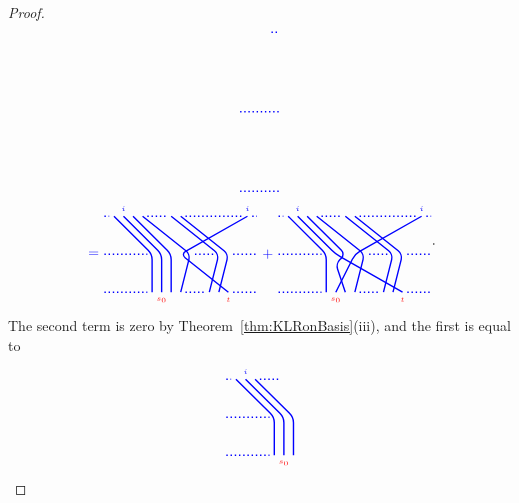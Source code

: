 \documentclass[twoside,11pt,reqno,letter]{amsart}
\numberwithin{equation}{section}
\theoremstyle{definition}  %
\newcommand{\0}{{\bar 0}}
\newcommand{\1}{{\bar 1}}
\newenvironment{braid}{%
  \begin{tikzpicture}[baseline=6mm,blue,line width=1pt, scale=0.4,
                      draw/.append style={rounded corners},
                      every node/.append style={font=\tiny}]%
  }{\end{tikzpicture}
}
\begin{document}
{\begin{proof}
\begin{equation}
\begin{braid}
    \draw[dotted](15.5,10)--(16,10);
    \draw[dotted](13.5,5)--(16,5);
    \draw[dotted](13.5,0)--(16,0);
  \end{braid}
\end{equation}
\[
  \begin{braid}\tikzset{scale=0.6,baseline=12mm}
    \draw(0,4)node[font=\normalsize]{$=$};
  \end{braid}
  \begin{braid}\tikzset{scale=0.6,baseline=12mm}
    \draw(1,8)--(5,4)--(5,0);
    \draw(2,8)node[above]{$i$}--(6,4)--(6,0)node[below,color=red]{$s_0$};
    \draw(3,8)--(7,4)--(7,0);
    \draw(15,8)node[above]{$i$}--(8,4)--(13,0)node[below,color=red]{$t$};
    \draw(4,8)--(9,4)--(8,0);
    \draw(7,8)--(12,4)--(11,0);
    \draw(8,8)--(13,4)--(12,0);
    \draw[dotted](0,8)--(0.5,8);
    \draw[dotted](0,4)--(4.5,4);
    \draw[dotted](0,0)--(4.5,0);
    \draw[dotted](4.5,8)--(6.5,8);
    \draw[dotted](9.5,4)--(11.5,4);
    \draw[dotted](8.5,0)--(10.5,0);
    \draw[dotted](8.5,8)--(14.5,8);
    \draw[dotted](15.5,8)--(16,8);
    \draw[dotted](13.5,4)--(16,4);
    \draw[dotted](13.5,0)--(16,0);
  \end{braid}
  \begin{braid}\tikzset{scale=0.6,baseline=12mm}
    \draw(0,4)node[font=\normalsize]{$+$};
  \end{braid}
  \begin{braid}\tikzset{scale=0.6,baseline=12mm}
    \draw(1,8)--(5,4)--(5,0);
    \draw(2,8)node[above]{$i$}--(6,4)--(13,0)node[below,color=red]{$t$};
    \draw(3,8)--(7,4)--(6,3)--(7,0);
    \draw(15,8)node[above]{$i$}--(8,4)--(6,0)node[below,color=red]{$s_0$};
    \draw(4,8)--(9,4)--(8,0);
    \draw(7,8)--(12,4)--(11,0);
    \draw(8,8)--(13,4)--(12,0);
    \draw[dotted](0,8)--(0.5,8);
    \draw[dotted](0,4)--(4.5,4);
    \draw[dotted](0,0)--(4.5,0);
    \draw[dotted](4.5,8)--(6.5,8);
    \draw[dotted](9.5,4)--(11.5,4);
    \draw[dotted](8.5,0)--(10.5,0);
    \draw[dotted](8.5,8)--(14.5,8);
    \draw[dotted](15.5,8)--(16,8);
    \draw[dotted](13.5,4)--(16,4);
    \draw[dotted](13.5,0)--(16,0);
  \end{braid}.
\]
The second term is zero by Theorem~\ref{thm:KLRonBasis}(iii), and the first is equal to
\[
  \begin{braid}\tikzset{scale=0.6,baseline=12mm}
    \draw[dotted](0,8)--(0.5,8);
    \draw[dotted](0,4)--(4.5,4);
    \draw[dotted](0,0)--(4.5,0);
    \draw(1,8)--(5,4)--(5,0);
    \draw(2,8)node[above]{$i$}--(6,4)--(6,0)node[below,color=red]{$s_0$};
    \draw(3,8)--(7,4)--(7,0);
    \draw[dotted](3.5,8)--(5.5,8);

\end{braid}\]
\end{proof}}
\end{document}
